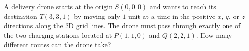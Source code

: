A delivery drone starts at the origin $S(0,0,0)$ and wants to reach its destination $T(3,3,1)$ by moving only $1$ unit at a time in the positive $x$, $y$, or $z$ directions along the 3D grid lines. The drone must pass through exactly one of the two charging stations located at $P(1,1,0)$ and $Q(2,2,1)$. How many different routes can the drone take?
